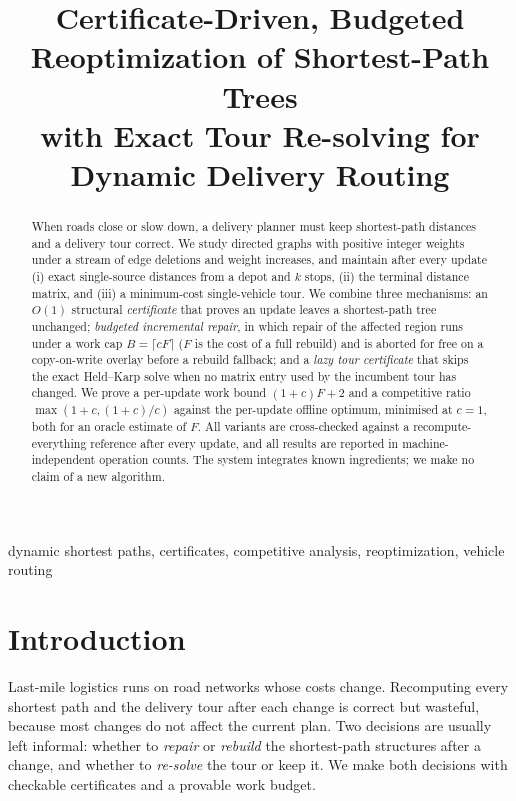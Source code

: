 \documentclass[conference]{IEEEtran}
\begin{document}
\title{Certificate-Driven, Budgeted Reoptimization of Shortest-Path Trees\\
with Exact Tour Re-solving for Dynamic Delivery Routing}

\author{
}

\maketitle

\begin{abstract}
When roads close or slow down, a delivery planner must keep shortest-path distances and a delivery tour correct.
We study directed graphs with positive integer weights under a stream of edge deletions and weight increases,
and maintain after every update (i) exact single-source distances from a depot and $k$ stops, (ii) the terminal distance matrix, and (iii) a minimum-cost single-vehicle tour.
We combine three mechanisms: an $O(1)$ structural \emph{certificate} that proves an update leaves a shortest-path tree unchanged;
\emph{budgeted incremental repair}, in which repair of the affected region runs under a work cap $B=\lceil cF\rceil$ ($F$ is the cost of a full rebuild) and is aborted for free on a copy-on-write overlay before a rebuild fallback;
and a \emph{lazy tour certificate} that skips the exact Held--Karp solve when no matrix entry used by the incumbent tour has changed.
We prove a per-update work bound $(1+c)F+2$ and a competitive ratio $\max(1+c,(1+c)/c)$ against the per-update offline optimum, minimised at $c=1$, both for an oracle estimate of $F$.
All variants are cross-checked against a recompute-everything reference after every update, and all results are reported in machine-independent operation counts.
The system integrates known ingredients; we make no claim of a new algorithm.
\end{abstract}

\begin{IEEEkeywords}
dynamic shortest paths, certificates, competitive analysis, reoptimization, vehicle routing
\end{IEEEkeywords}

\section{Introduction}
Last-mile logistics runs on road networks whose costs change. Recomputing every shortest path and the delivery tour after each change is correct but wasteful, because most changes do not affect the current plan.
Two decisions are usually left informal: whether to \emph{repair} or \emph{rebuild} the shortest-path structures after a change, and whether to \emph{re-solve} the tour or keep it.
We make both decisions with checkable certificates and a provable work budget.
\end{document}
